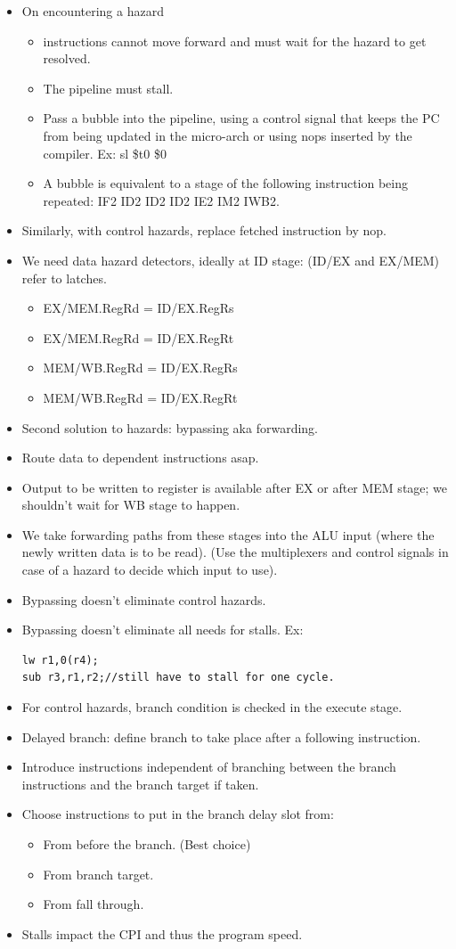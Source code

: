 \documentclass{report}
\begin{document}
\begin{itemize}
\item On encountering a hazard
\begin{itemize}
\item instructions cannot move forward and must wait for the hazard to get resolved.
\item The pipeline must stall.
\item Pass a bubble into the pipeline, using a control signal that keeps the PC from being updated in the micro-arch or using nops inserted by the compiler. Ex: sl \$t0 \$0
\item A bubble is equivalent to a stage of the following instruction being repeated: IF2 ID2 ID2 ID2 IE2 IM2 IWB2.
\end{itemize}
\item Similarly, with control hazards, replace fetched instruction by nop.
\item We need data hazard detectors, ideally at ID stage: (ID/EX and EX/MEM) refer to latches.
\begin{itemize}
    \item EX/MEM.RegRd = ID/EX.RegRs
    \item EX/MEM.RegRd = ID/EX.RegRt
    \item MEM/WB.RegRd = ID/EX.RegRs
    \item MEM/WB.RegRd = ID/EX.RegRt
\end{itemize}
\item Second solution to hazards: bypassing aka forwarding.
\item Route data to dependent instructions asap.
\item Output to be written to register is available after EX or after MEM stage; we shouldn't wait for WB stage to happen.
\item We take forwarding paths from these stages into the ALU input (where the newly written data is to be read). (Use the multiplexers and control signals in case of a hazard to decide which input to use).
\item Bypassing doesn't eliminate control hazards.
\item Bypassing doesn't eliminate all needs for stalls. Ex:
\begin{lstlisting}
lw r1,0(r4);
sub r3,r1,r2;//still have to stall for one cycle.
\end{lstlisting}
\item For control hazards, branch condition is checked in the execute stage.
\item Delayed branch: define branch to take place after a following instruction.
\item Introduce instructions independent of branching between the branch instructions and the branch target if taken.
\item Choose instructions to put in the branch delay slot from:
\begin{itemize}
    \item From before the branch. (Best choice)
    \item From branch target.
    \item From fall through.
\end{itemize}
\item Stalls impact the CPI and thus the program speed.
\end{itemize}
\end{document}
